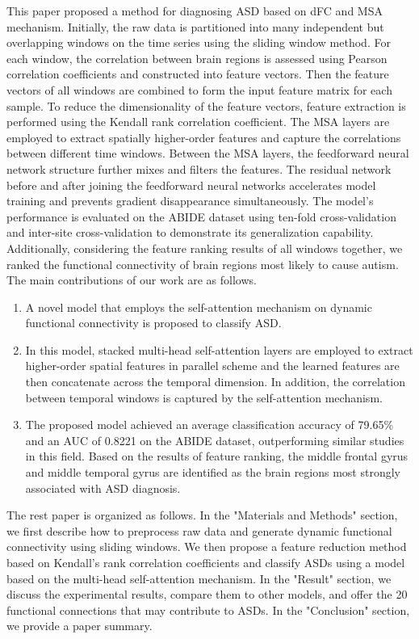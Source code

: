 \documentclass[journal,twoside,web]{ieeecolor}
\begin{document}
This paper proposed a method for diagnosing ASD based on dFC and MSA mechanism. Initially, the raw data is partitioned into many independent but overlapping  windows on the time series using the sliding window method. For each window, the correlation between brain regions is assessed using Pearson correlation coefficients and constructed into feature vectors. Then the feature vectors of all windows are combined to form the input feature matrix for each sample. To reduce the dimensionality of the feature vectors, feature extraction is performed using the Kendall rank correlation coefficient. The MSA layers are employed to extract spatially higher-order features and capture the correlations between different time windows. Between the MSA layers, the feedforward neural network structure further mixes and filters the features. The residual network before and after joining the feedforward neural networks accelerates model training and prevents gradient disappearance simultaneously. The model's performance is evaluated on the ABIDE dataset using ten-fold cross-validation and inter-site cross-validation to demonstrate its generalization capability. Additionally, considering the feature ranking results of all windows together, we ranked the functional connectivity of brain regions most likely to cause autism. The main contributions of our work are as follows.
\begin{enumerate}
	\item A novel model that employs the self-attention mechanism on dynamic functional connectivity is proposed to classify ASD.
	\item In this model, stacked multi-head self-attention layers are employed to extract higher-order spatial features in parallel scheme and the learned features are then concatenate across the temporal dimension. In addition, the correlation between temporal windows is captured by the self-attention mechanism.
	\item The proposed model achieved an average classification accuracy of 79.65\% and an AUC of 0.8221 on the ABIDE dataset, outperforming similar studies in this field. Based on the results of feature ranking, the middle frontal gyrus and middle temporal gyrus are identified as the brain regions most strongly associated with ASD diagnosis.

\end{enumerate}  

The rest paper is organized as follows. In the "Materials and Methods" section, we first describe how to preprocess raw data and generate dynamic functional connectivity using sliding windows. We then propose a feature reduction method based on Kendall's rank correlation coefficients and classify ASDs using a model based on the multi-head self-attention mechanism. In the "Result" section, we discuss the experimental results, compare them to other models, and offer the 20 functional connections that may contribute to ASDs. In the "Conclusion" section, we provide a paper summary.
\end{document}
